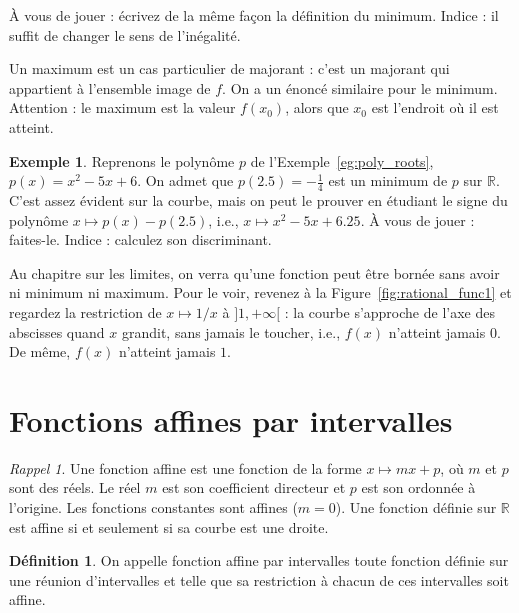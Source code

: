 \documentclass[12pt,a4paper]{article}
\theoremstyle{plain}
\theoremstyle{definition}
\newtheorem{definition}[theorem]{Définition}
\newtheorem{example}[theorem]{Exemple}
\theoremstyle{remark}
\newtheorem*{recall}{Rappel}
\begin{document}
À vous de jouer : écrivez de la même façon la définition du minimum. Indice : il
suffit de changer le sens de l'inégalité.

Un maximum est un cas particulier de majorant : c'est un majorant qui appartient à
l'ensemble image de $f$. On a un énoncé similaire pour le minimum. Attention : le
maximum est la valeur $f(x_0)$, alors que $x_0$ est l'endroit où il est atteint.

\begin{example}
  Reprenons le polynôme $p$ de l'Exemple~\ref{eg:poly_roots}, $p(x) = x^2 - 5x + 6$.
  On admet que $p(2.5) = -\frac{1}{4}$ est un minimum de $p$ sur $\mathbb{R}$. C'est
  assez évident sur la courbe, mais on peut le prouver en étudiant le signe du
  polynôme $x \mapsto p(x) - p(2.5)$, i.e., $x \mapsto x^2 - 5x + 6.25$.
  À vous de jouer : faites-le. Indice : calculez son discriminant.
\end{example}

Au chapitre sur les limites, on verra qu'une fonction peut être bornée sans avoir
ni minimum ni maximum. Pour le voir, revenez à la Figure~\ref{fig:rational_func1} et
regardez la restriction de $x \mapsto 1/x$ à $]1, +\infty[$ : la courbe s'approche
de l'axe des abscisses quand $x$ grandit, sans jamais le toucher, i.e., $f(x)$
n'atteint jamais $0$. De même, $f(x)$ n'atteint jamais $1$.

\section{Fonctions affines par intervalles}

\begin{recall}
  Une fonction affine est une fonction de la forme $x \mapsto mx + p$, où $m$ et $p$
  sont des réels. Le réel $m$ est son coefficient directeur et $p$ est son ordonnée
  à l'origine. Les fonctions constantes sont affines ($m = 0$). Une fonction définie
  sur $\mathbb{R}$ est affine si et seulement si sa courbe est une droite.
\end{recall}

\begin{tcolorbox}[navybar]
  \begin{definition}
    On appelle fonction affine par intervalles toute fonction définie sur une réunion
    d'intervalles et telle que sa restriction à chacun de ces intervalles soit
    affine.
  \end{definition}
\end{tcolorbox}
\end{document}
